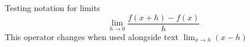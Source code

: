 Testing notation for limits
$$\lim_{h \rightarrow 0}\frac{f(x+h)-f(x)}{h}$$
This operator changes when used alongside 
text $\lim_{x \rightarrow h} (x-h)$
